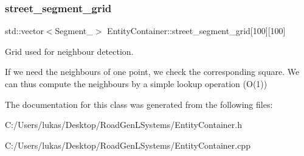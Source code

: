 \subsubsection{\texorpdfstring{street\+\_\+segment\+\_\+grid}{street\_segment\_grid}}
{\footnotesize\ttfamily std\+::vector$<$Segment\+\_$>$ Entity\+Container\+::street\+\_\+segment\+\_\+grid\mbox{[}100\mbox{]}\mbox{[}100\mbox{]}}



Grid used for neighbour detection. 

If we need the neighbours of one point, we check the corresponding square. We can thus compute the neighbours by a simple lookup operation {\ttfamily }(O(1)) 

The documentation for this class was generated from the following files\+:\begin{DoxyCompactItemize}
\item 
C\+:/\+Users/lukas/\+Desktop/\+Road\+Gen\+L\+Systems/Entity\+Container.\+h\item 
C\+:/\+Users/lukas/\+Desktop/\+Road\+Gen\+L\+Systems/Entity\+Container.\+cpp\end{DoxyCompactItemize}
